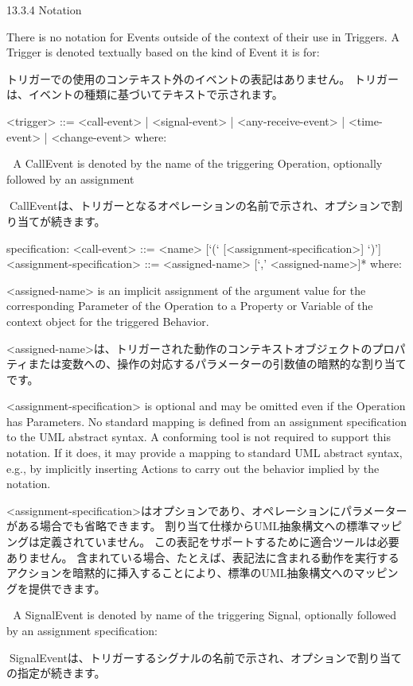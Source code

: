 \documentclass[a4paper,11pt]{ltjsarticle}
\begin{document}
13.3.4 Notation

There is no notation for Events outside of the context of their use in Triggers. 
A Trigger is denoted textually based on the kind of Event it is for:

トリガーでの使用のコンテキスト外のイベントの表記はありません。
トリガーは、イベントの種類に基づいてテキストで示されます。

<trigger> ::= <call-event> | <signal-event> | <any-receive-event> | <time-event> | <change-event>
where:

 A CallEvent is denoted by the name of the triggering Operation, optionally followed by an assignment

CallEventは、トリガーとなるオペレーションの名前で示され、オプションで割り当てが続きます。

specification:
<call-event> ::= <name> [‘(‘ [<assignment-specification>] ‘)’]
<assignment-specification> ::= <assigned-name> [‘,’ <assigned-name>]*
where:

<assigned-name> is an implicit assignment of the argument value for the corresponding Parameter of the Operation to a Property or Variable of the context object for the triggered Behavior.

<assigned-name>は、トリガーされた動作のコンテキストオブジェクトのプロパティまたは変数への、操作の対応するパラメーターの引数値の暗黙的な割り当てです。

<assignment-specification> is optional and may be omitted even if the Operation has Parameters. 
No standard mapping is defined from an assignment specification to the UML abstract syntax. 
A conforming tool is not required to support this notation. 
If it does, it may provide a mapping to standard UML abstract syntax, e.g., by implicitly inserting Actions to carry out the behavior implied by the notation.

<assignment-specification>はオプションであり、オペレーションにパラメーターがある場合でも省略できます。
割り当て仕様からUML抽象構文への標準マッピングは定義されていません。
この表記をサポートするために適合ツールは必要ありません。
含まれている場合、たとえば、表記法に含まれる動作を実行するアクションを暗黙的に挿入することにより、標準のUML抽象構文へのマッピングを提供できます。

 A SignalEvent is denoted by name of the triggering Signal, optionally followed by an assignment specification:

SignalEventは、トリガーするシグナルの名前で示され、オプションで割り当ての指定が続きます。
\end{document}
